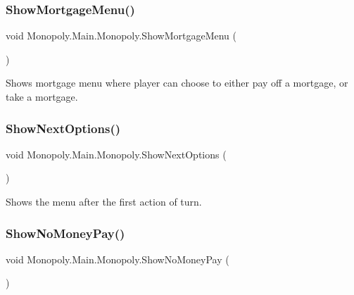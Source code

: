 \subsubsection{\texorpdfstring{Show\+Mortgage\+Menu()}{ShowMortgageMenu()}}
{\footnotesize\ttfamily void Monopoly.\+Main.\+Monopoly.\+Show\+Mortgage\+Menu (\begin{DoxyParamCaption}{ }\end{DoxyParamCaption})\hspace{0.3cm}{\ttfamily [inline]}}

Shows mortgage menu where player can choose to either pay off a mortgage, or take a mortgage. \mbox{\label{class_monopoly_1_1_main_1_1_monopoly_a977c5ee928577d2b20660f14b4e2f44d}} 
\subsubsection{\texorpdfstring{Show\+Next\+Options()}{ShowNextOptions()}}
{\footnotesize\ttfamily void Monopoly.\+Main.\+Monopoly.\+Show\+Next\+Options (\begin{DoxyParamCaption}{ }\end{DoxyParamCaption})\hspace{0.3cm}{\ttfamily [inline]}}

Shows the menu after the first action of turn. \mbox{\label{class_monopoly_1_1_main_1_1_monopoly_a53ef720a23cd66cc563b357c94351a3a}} 
\subsubsection{\texorpdfstring{Show\+No\+Money\+Pay()}{ShowNoMoneyPay()}}
{\footnotesize\ttfamily void Monopoly.\+Main.\+Monopoly.\+Show\+No\+Money\+Pay (\begin{DoxyParamCaption}{ }\end{DoxyParamCaption})\hspace{0.3cm}{\ttfamily [inline]}}


